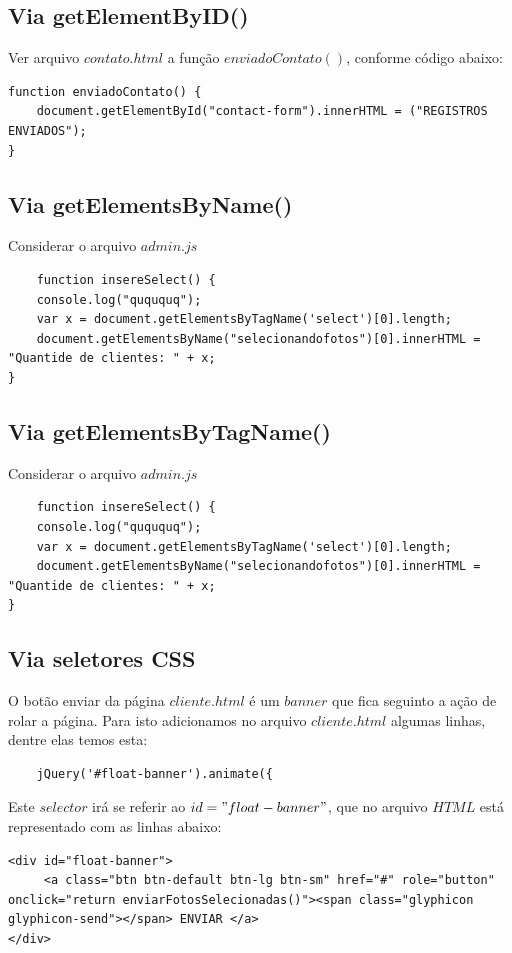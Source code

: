 \subsection{Via getElementByID()}
	Ver arquivo $contato.html$ a função $enviadoContato()$, conforme código abaixo:
	
\begin{lstlisting}
function enviadoContato() {
    document.getElementById("contact-form").innerHTML = ("REGISTROS ENVIADOS");
}
\end{lstlisting}

\subsection{Via getElementsByName()}

	Considerar o arquivo $admin.js$
\begin{lstlisting}
	function insereSelect() {
    console.log("quququq");
    var x = document.getElementsByTagName('select')[0].length;
    document.getElementsByName("selecionandofotos")[0].innerHTML = "Quantide de clientes: " + x;
}
\end{lstlisting}

\subsection{Via getElementsByTagName()}
	Considerar o arquivo $admin.js$
\begin{lstlisting}
	function insereSelect() {
    console.log("quququq");
    var x = document.getElementsByTagName('select')[0].length;
    document.getElementsByName("selecionandofotos")[0].innerHTML = "Quantide de clientes: " + x;
}
\end{lstlisting}


\subsection{Via seletores CSS}
	O botão enviar da página $cliente.html$ é um $banner$ que fica seguinto a ação de rolar a página. Para isto adicionamos no arquivo $cliente.html$ algumas linhas, dentre elas temos esta:
		\begin{lstlisting}	
	jQuery('#float-banner').animate({
		\end{lstlisting}
		Este $selector$ irá se referir ao $id="float-banner"$, que no arquivo $HTML$ está representado com as linhas abaixo:
\begin{lstlisting}
<div id="float-banner">
     <a class="btn btn-default btn-lg btn-sm" href="#" role="button" onclick="return enviarFotosSelecionadas()"><span class="glyphicon glyphicon-send"></span> ENVIAR </a>
</div>
\end{lstlisting}

